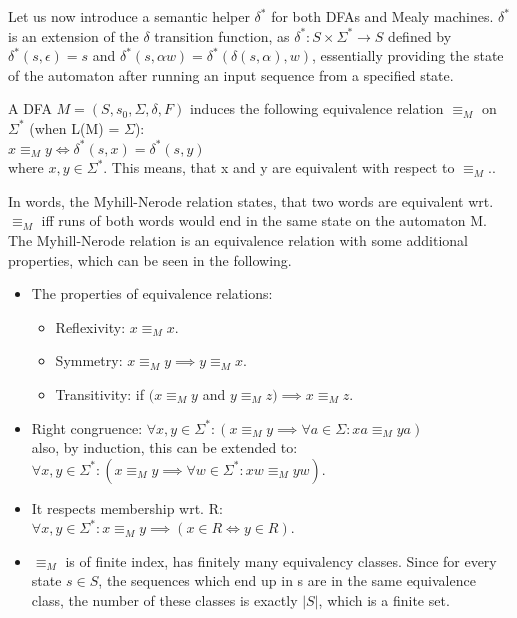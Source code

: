 Let us now introduce a semantic helper $\delta^*$ for both DFAs and Mealy machines. $\delta^*$ is an extension of the $\delta$ transition function, as $\delta^*: S\times\Sigma^* \to S$ defined by $\delta^*(s,\epsilon) = s$ and $\delta^*(s, \alpha w) = \delta^*(\delta(s, \alpha), w)$, essentially providing the state of the automaton after running an input sequence from a specified state.

\begin{definition} 
	A DFA $M=(S,s_{0},\Sigma,\delta,F)$ induces the following equivalence relation $\equiv_M$ on $\Sigma^*$ (when L(M) = $\Sigma$):\\
	\null\qquad$x\equiv_M y \iff \delta^*(s, x) = \delta^*(s, y)$\\
	where $x, y\in\Sigma^*$. This means, that x and y are equivalent with respect to $\equiv_M$.\cite{Kozen1977}.
\end{definition}

In words, the Myhill-Nerode relation states, that two words are equivalent wrt. $\equiv_M$ iff runs of both words would end in the same state on the automaton M. The Myhill-Nerode relation is an equivalence relation with some additional properties\cite{Kozen1977}, which can be seen in the following.


\begin{itemize}
	\item The properties of equivalence relations:
	\begin{itemize}
		\item Reflexivity: $x\equiv_M x$.
		\item Symmetry: $x\equiv_M y \implies y\equiv_M x$.
		\item Transitivity: if $(x\equiv_M y$ and $y\equiv_M z) \implies x\equiv_M z$.
	\end{itemize}
	\item Right congruence: $\forall x, y\in\Sigma^*: (x\equiv_M y \implies 		\forall a\in\Sigma: xa\equiv_Mya)$\\ also, by induction, this can be extended to:\\
	$\forall x, y\in\Sigma^*: (x\equiv_M y \implies \forall w\in\Sigma^*: xw\equiv_Myw)$. 
	\item It respects membership wrt. R:\\
	$\forall x, y\in\Sigma^*: x\equiv_M y \implies (x\in R \iff y\in R)$.
	\item $\equiv_M$ is of finite index, has finitely many equivalency classes. Since for every state $s\in S$, the sequences which end up in s are in the same equivalence class, the number of these classes is exactly $|S|$, which is a finite set.
\end{itemize}

